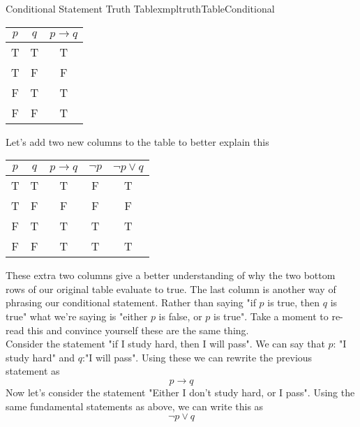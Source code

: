 \begin{exmpl}[label={exmpl:truthTableConditional}]{Conditional Statement Truth Table}{xmpltruthTableConditional}
    \begin{center}
        \begin{tabular}{|c|c|c|}
            \hline
            $p$ & $q$ & $p \to q$ \\
            \hline
            T   & T   & T         \\
            \hline
            T   & F   & F         \\
            \hline
            F   & T   & T         \\
            \hline
            F   & F   & T         \\
            \hline
        \end{tabular}
    \end{center}
    \vspace{0.5cm}
    Let's add two new columns to the table to better explain this
    \begin{center}
        \begin{tabular}{|c|c|c|c|c|}
            \hline
            $p$ & $q$ & $p \to q$ & $\lnot p$ & $\lnot p \lor q$ \\
            \hline
            T   & T   & T         & F         & T                \\
            \hline
            T   & F   & F         & F         & F                \\
            \hline
            F   & T   & T         & T         & T                \\
            \hline
            F   & F   & T         & T         & T                \\
            \hline
        \end{tabular}
    \end{center}
    \vspace{0.5cm}
    These extra two columns give a better understanding of why the two bottom rows of our original table evaluate to true. The last column is another way of phrasing our conditional statement. Rather than saying "if $p$ is true, then $q$ is true" what we're saying is "either $p$ is false, or $p$ is true". Take a moment to re-read this and convince yourself these are the same thing.\\

    Consider the statement "if I study hard, then I will pass". We can say that $p$: "I study hard" and $q$:"I will pass". Using these we can rewrite the previous statement as
    $$p \to q$$
    Now let's consider the statement "Either I don't study hard, or I pass". Using the same fundamental statements as above, we can write this as
    $$\lnot p \lor q$$
\end{exmpl}

